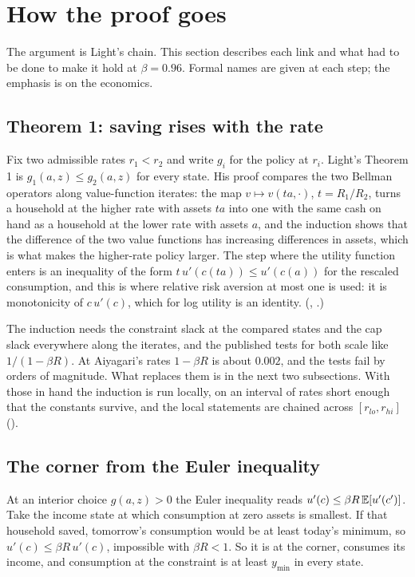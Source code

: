 \section{How the proof goes}\label{sec:arch}

The argument is Light's chain. This section describes each link and what had to be done to make
it hold at $\beta=0.96$. Formal names are given at each step; the emphasis is on the economics.

\subsection{Theorem 1: saving rises with the rate}\label{sec:thm1}

Fix two admissible rates $r_1<r_2$ and write $g_i$ for the policy at $r_i$. Light's Theorem 1 is
$g_1(a,z)\le g_2(a,z)$ for every state. His proof compares the two Bellman operators along
value-function iterates: the map $v\mapsto v(ta,\cdot)$, $t=R_1/R_2$, turns a household at the
higher rate with assets $ta$ into one with the same cash on hand as a household at the lower rate
with assets $a$, and the induction shows that the difference of the two value functions has
increasing differences in assets, which is what makes the higher-rate policy larger. The step where
the utility function enters is an inequality of the form $t\,u'(c(ta))\le u'(c(a))$ for the
rescaled consumption, and this is where relative risk aversion at most one is used: it is
monotonicity of $c\,u'(c)$, which for log utility is an identity.
(, .)

The induction needs the constraint slack at the compared states and the cap slack everywhere along
the iterates, and the published tests for both scale like $1/(1-\beta R)$. At Aiyagari's rates
$1-\beta R$ is about $0.002$, and the tests fail by orders of magnitude. What replaces them is in
the next two subsections. With those in hand the induction is run locally, on an interval of rates
short enough that the constants survive, and the local statements are chained across
$[r_{lo},r_{hi}]$ ().

\subsection{The corner from the Euler inequality}\label{sec:corner}

\begin{lemma}
At an interior choice $g(a,z)>0$ the Euler inequality reads $u'(c)\le\beta R\,\mathbb{E}[u'(c')]$. Take the
income state at which consumption at zero assets is smallest. If that household saved, tomorrow's
consumption would be at least today's minimum, so $u'(c)\le\beta R\,u'(c)$, impossible with
$\beta R<1$. So it is at the corner, consumes its income, and consumption at the constraint is at
least $y_{\min}$ in every state.
\end{lemma}

